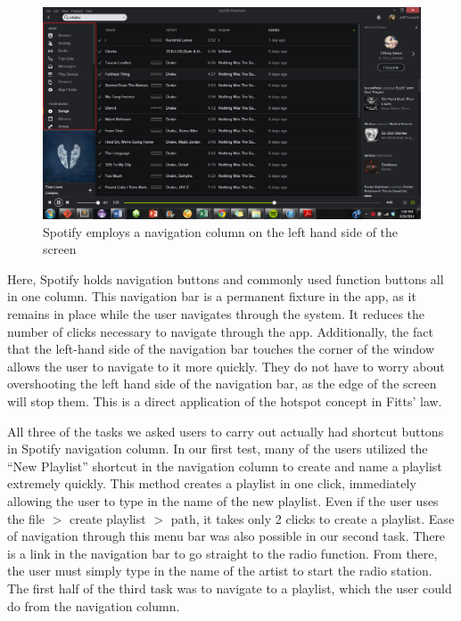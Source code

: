 \documentclass[12pt]{article}
\begin{document}
\begin{figure}[H]
	\centering
	\includegraphics[width=\textwidth]{chart4.png}
	\caption{Spotify employs a navigation column on the left 
hand side of the screen}
\end{figure}

Here, Spotify holds navigation buttons and commonly used function 
buttons all in one column. This navigation bar is a permanent 
fixture in the app, as it remains in place while the user 
navigates through the system. It reduces the number of clicks 
necessary to navigate through the app. Additionally, the fact that 
the left-hand side of the navigation bar touches the corner of the 
window allows the user to navigate to it more quickly. They do not 
have to worry about overshooting the left hand side of the 
navigation bar, as the edge of the screen will stop them. This is 
a direct application of the hotspot concept in Fitts' law.

 All three of the tasks we asked users to carry out actually had 
shortcut buttons in Spotify navigation column. In our first 
test, many of the users utilized the ``New Playlist'' shortcut in 
the navigation column to create and name a playlist extremely 
quickly. This method creates a playlist in one click, immediately 
allowing the user to type in the name of the new playlist. Even if 
the user uses the file \(>\) create playlist \(>\) path,
it takes only 2
clicks to create a playlist. Ease of navigation through this menu 
bar was also possible in our second task. There is a link in the 
navigation bar to go straight to the radio function. From there, 
the user must simply type in the name of the artist to start the 
radio station. The first half of the third task was to navigate to 
a playlist, which the user could do from the navigation column.
\end{document}
